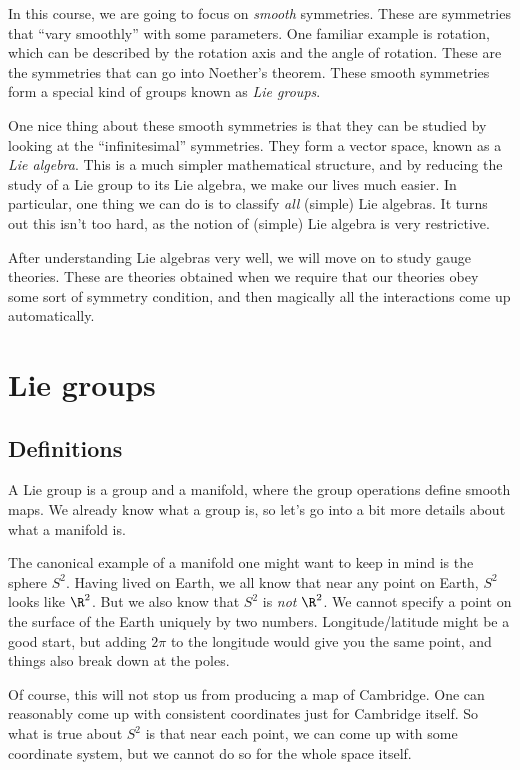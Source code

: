 \documentclass[a4paper]{article}
\begin{document}
In this course, we are going to focus on \emph{smooth} symmetries. These are symmetries that ``vary smoothly'' with some parameters. One familiar example is rotation, which can be described by the rotation axis and the angle of rotation. These are the symmetries that can go into Noether's theorem. These smooth symmetries form a special kind of groups known as \emph{Lie groups}.

One nice thing about these smooth symmetries is that they can be studied by looking at the ``infinitesimal'' symmetries. They form a vector space, known as a \emph{Lie algebra}. This is a much simpler mathematical structure, and by reducing the study of a Lie group to its Lie algebra, we make our lives much easier. In particular, one thing we can do is to classify \emph{all} (simple) Lie algebras. It turns out this isn't too hard, as the notion of (simple) Lie algebra is very restrictive.

After understanding Lie algebras very well, we will move on to study gauge theories. These are theories obtained when we require that our theories obey some sort of symmetry condition, and then magically all the interactions come up automatically.

\section{Lie groups}
\subsection{Definitions}
A Lie group is a group and a manifold, where the group operations define smooth maps. We already know what a group is, so let's go into a bit more details about what a manifold is.

The canonical example of a manifold one might want to keep in mind is the sphere $S^2$. Having lived on Earth, we all know that near any point on Earth, $S^2$ looks like $\R^2$. But we also know that $S^2$ is \emph{not} $\R^2$. We cannot specify a point on the surface of the Earth uniquely by two numbers. Longitude/latitude might be a good start, but adding $2\pi$ to the longitude would give you the same point, and things also break down at the poles.

Of course, this will not stop us from producing a map of Cambridge. One can reasonably come up with consistent coordinates just for Cambridge itself. So what is true about $S^2$ is that near each point, we can come up with some coordinate system, but we cannot do so for the whole space itself.
\end{document}
